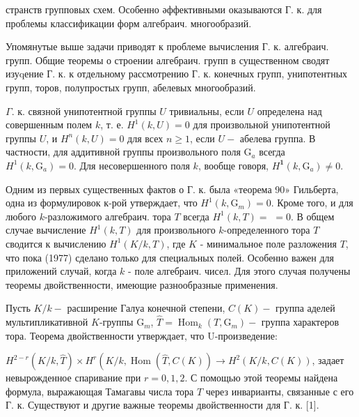 \documentclass[10pt]{article}
\begin{document}
странств групповых схем. Особенно әффективными оказываются Г. к. для проблемы классификации форм алгебраич. многообразий.



Упомянутые выше задачи приводят к проблеме вычисления $Г$. к. алгебраич. групп. Общие теоремы о строении алгебраич. групп в существенном сводят изуqение $Г$. к. к отдельному рассмотрению Г. к. конечных групп, унипотентных групп, торов, полупростых групп, абелевых многообразий.



$\Gamma$. к. связной унипотентной группы $U$ тривиальны, если $U$ определена над совершенным полем $k$, т. е. $H^{1}(k, U)=0$ для произвольной унипотентной группы $U$, и $H^{n}(k, U)=0$ для всех $n \geqslant 1$, если $U-$ абелева группа. В частности, для аддитивной группы произвольного поля $\mathrm{G}_{a}$ всегда $H^{1}\left(k, \mathrm{G}_{a}\right)=0$. Для несовершенного поля $k$, вообще говоря, $H^{\mathbf{1}}\left(k, \mathrm{G}_{a}\right) \neq 0$.



Одним из первых существенных фактов о Г. к. была «теорема 90» Гильберта, одна из формулировок к-рой утверждает, что $H^{1}\left(k, \mathrm{G}_{m}\right)=0$. Кроме того, и для любого $k$-разложимого алгебраич. тора $T$ всегда $H^{1}(k, T)=$ $=0$. В общем случае вычисление $H^{1}(k, T)$ для произвольного $k$-определенного тора $T$ сводится к вычислению $H^{1}(K / k, T)$, где $K$ - минимальное поле разложения $T$, что пока (1977) сделано только для специальных полей. Особенно важен для приложений случай, когда $k$ - поле алгебраич. чисел. Для этого случая получены теоремы двойственности, имеющие разнообразные применения.



Пусть $K / k-$ расширение Галуа конечной степени, $C(K)-$ группа аделей мультипликативной $K$-группы $\mathrm{G}_{m}$, $\widehat{T}=\operatorname{Hom}_{k}\left(T, \mathrm{G}_{m}\right)-$ группа характеров тора. Теорема двойственности утверждает, что U-произведение:



$H^{2-r}(K / k, \hat{T}) \times H^{r}\left(K / k, \operatorname{Hom}(\widehat{T}, C(K)) \rightarrow H^{2}(K / k, C(K))\right.$, задает невырожденное спаривание при $r=0,1,2$. С помощью этой теоремы найдена формула, выражающая Тамагавы числа тора $T$ через инварианты, связанные с его Г. к. Существуют и другие важные теоремы двойственности для Г. к. [1].
\end{document}
